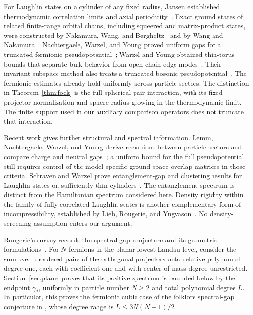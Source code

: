 For Laughlin states on a cylinder of any fixed radius, Jansen established
thermodynamic correlation limits and axial periodicity~\cite{Jansen2012}.
Exact ground states of related finite-range orbital chains, including
squeezed and matrix-product states, were constructed by Nakamura, Wang, and
Bergholtz~\cite{NakamuraWangBergholtz2012} and by Wang and
Nakamura~\cite{WangNakamura2013}. Nachtergaele, Warzel, and Young proved
uniform gaps for a truncated fermionic pseudopotential~\cite{NWY};
Warzel and Young obtained thin-torus bounds that separate bulk behavior
from open-chain edge modes~\cite{WY}. Their invariant-subspace method
also treats a truncated bosonic pseudopotential~\cite{WarzelYoung2023BulkEdge}.
The fermionic estimates already hold uniformly across particle sectors.
The distinction in Theorem~\ref{thm:fock} is the full spherical pair
interaction, with its fixed projector normalization and sphere radius
growing in the thermodynamic limit. The finite support used in our
auxiliary comparison operators does not truncate that interaction.

Recent work gives further structural and spectral information.
Lemm, Nachtergaele, Warzel, and Young derive recursions between particle
sectors and compare charge and neutral gaps~\cite{LemmNachtergaeleWarzelYoung2026Recursive};
a uniform bound for the full pseudopotential still requires control of
the model-specific ground-space overlap matrices in those criteria.
Schraven and Warzel prove entanglement-gap and clustering results for
Laughlin states on sufficiently thin cylinders~\cite{SchravenWarzel2026IMPS}.
The entanglement spectrum is distinct from the Hamiltonian spectrum
considered here. Density rigidity within the family of fully correlated
Laughlin states is another complementary form of incompressibility,
established by Lieb, Rougerie, and Yngvason~\cite{LRYRigidity}.
No density-screening assumption enters our argument.

Rougerie's survey records the spectral-gap conjecture and its geometric
formulations~\cite[Appendix~A]{Rougerie}. For $N$ fermions in the planar
lowest Landau level, consider the sum over unordered pairs of the orthogonal
projectors onto relative polynomial degree one, each with coefficient one
and with center-of-mass degree unrestricted. Section~\ref{sec:plane} proves
that its positive spectrum is bounded below by the endpoint $\gamma_*$,
uniformly in particle number $N\ge2$ and total polynomial degree $L$.
In particular, this proves the fermionic cubic case of the folklore
spectral-gap conjecture in \cite[Conjecture~A.1]{Rougerie}, whose degree range
is $L\le3N(N-1)/2$.

